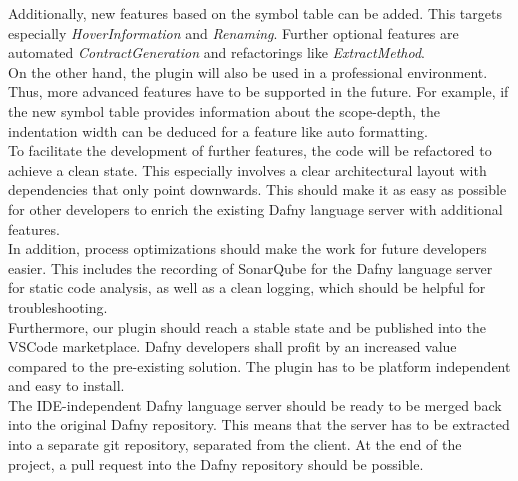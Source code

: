 Additionally, new features based on the symbol table can be added.
This targets especially \textit{HoverInformation} and \textit{Renaming}.
Further optional features are automated \textit{ContractGeneration} and refactorings like \textit{ExtractMethod}. \\

On the other hand, the plugin will also be used in a professional environment.
Thus, more advanced features have to be supported in the future.
For example, if the new symbol table provides information about the scope-depth, the indentation width can be deduced for a feature like auto formatting.\\

To facilitate the development of further features, the code will be refactored to achieve a clean state.
This especially involves a clear architectural layout with dependencies that only point downwards.
This should make it as easy as possible for other developers to enrich the existing Dafny language server with additional features. \\

In addition, process optimizations should make the work for future developers easier.
This includes the recording of SonarQube for the Dafny language server for static code analysis,
as well as a clean logging,
which should be helpful for troubleshooting. \\

Furthermore, our plugin should reach a stable state and be published into the VSCode marketplace.
Dafny developers shall profit by an increased value compared to the pre-existing solution.
The plugin has to be platform independent and easy to install. \\

The IDE-independent Dafny language server should be ready to be merged back into the original Dafny repository.
This means that the server has to be extracted into a separate git repository, separated from the client.
At the end of the project, a pull request into the Dafny repository should be possible.

